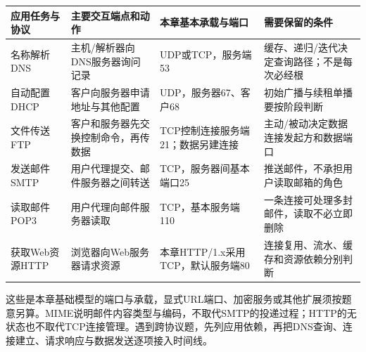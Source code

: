 \begin{wideblock}

\par\medskip\noindent\begin{minipage}{\linewidth}\fontsize{9.3}{12}\selectfont\begin{tabularx}{\linewidth}{@{}YYYY@{}}
\toprule\noalign{}
\begin{minipage}[b]{\linewidth}\raggedright
应用任务与协议
\end{minipage} & \begin{minipage}[b]{\linewidth}\raggedright
主要交互端点和动作
\end{minipage} & \begin{minipage}[b]{\linewidth}\raggedright
本章基本承载与端口
\end{minipage} & \begin{minipage}[b]{\linewidth}\raggedright
需要保留的条件
\end{minipage} \\
\midrule\noalign{}


名称解析DNS & 主机/解析器向DNS服务器询问记录 & UDP或TCP，服务端53 & 缓存、递归/迭代决定查询路径；不是每次必经根 \\
自动配置DHCP & 客户向服务器申请地址与其他配置 & UDP，服务器67、客户68 & 初始广播与续租单播要按阶段判断 \\
文件传送FTP & 客户和服务器先交换控制命令，再传数据 & TCP控制连接服务端21；数据另建连接 & 主动/被动决定数据连接发起方和数据端口 \\
发送邮件SMTP & 用户代理提交、邮件服务器之间转送 & TCP，服务器间基本端口25 & 推送邮件，不承担用户读取邮箱的角色 \\
读取邮件POP3 & 用户代理向邮件服务器读取 & TCP，基本服务端110 & 一条连接可处理多封邮件，读取不必立即删除 \\
获取Web资源HTTP & 浏览器向Web服务器请求资源 & 本章HTTP/1.x采用TCP，默认服务端80 & 连接复用、流水、缓存和资源依赖分别判断 \\
\bottomrule\end{tabularx}
\end{minipage}\par\medskip

\end{wideblock}

这些是本章基础模型的端口与承载，显式URL端口、加密服务或其他扩展须按题意另算。MIME说明邮件内容类型与编码，不取代SMTP的投递过程；HTTP的无状态也不取代TCP连接管理。遇到跨协议题，先列应用依赖，再把DNS查询、连接建立、请求响应与数据发送逐项接入时间线。

